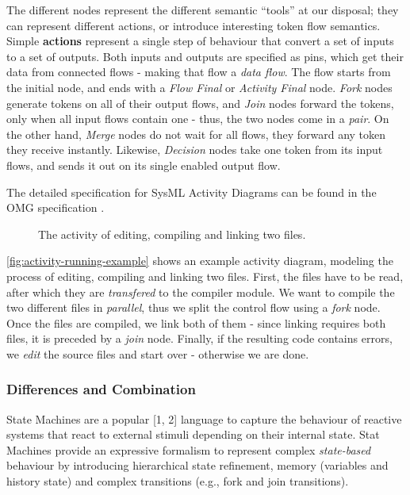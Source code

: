 The different nodes represent the different semantic \enquote{tools} at our disposal; they can represent different actions, or introduce interesting token flow semantics.
Simple \textbf{actions} represent a single step of behaviour that convert a set of inputs to a set of outputs. Both inputs and outputs are specified as pins, which get their data from connected flows - making that flow a \emph{data flow}. The flow starts from the initial node, and ends with a \emph{Flow Final} or \emph{Activity Final} node. \emph{Fork} nodes generate tokens on all of their output flows, and \emph{Join} nodes forward the tokens, only when all input flows contain one - thus, the two nodes come in a \emph{pair}. On the other hand, \emph{Merge} nodes do not wait for all flows, they forward any token they receive instantly. Likewise, \emph{Decision} nodes take one token from its input flows, and sends it out on its single enabled output flow.

The detailed specification for SysML Activity Diagrams can be found in the OMG specification \cite{omg_sysml}.

\begin{figure}[!ht]
	\centering
	
	\caption{The activity of editing, compiling and linking two files.}
	\label{fig:activity-running-example}
\end{figure}

\autoref{fig:activity-running-example} shows an example activity diagram, modeling the process of editing, compiling and linking two files. First, the files have to be read, after which they are \emph{transfered} to the compiler module. We want to compile the two different files in \emph{parallel}, thus we split the control flow using a \emph{fork} node. Once the files are compiled, we link both of them - since linking requires both files, it is preceded by a \emph{join} node. Finally, if the resulting code contains errors, we \emph{edit} the source files and start over - otherwise we are done.

\iffalse
\subsubsection{Differences and Combination}

State Machines are a popular [1, 2] language to capture the behaviour
of reactive systems\cite{HAREL1987231} that react to external stimuli depending on
their internal state. Stat Machines provide an expressive formalism to
represent complex \emph{state-based} behaviour by introducing hierarchical
state refinement, memory (variables and history state) and complex
transitions (e.g., fork and join transitions).

